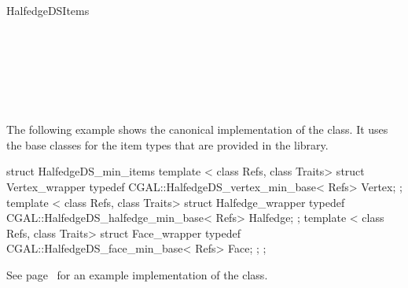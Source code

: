 \begin{ccRefConcept}{HalfedgeDSItems}
\\
\\
\\
\\
\\
\\
\\

\ccExample

The following example shows the canonical implementation of the
 class. It uses the base classes for the
item types that are provided in the library.

\begin{ccExampleCode}
struct HalfedgeDS_min_items {
    template < class Refs, class Traits>
    struct Vertex_wrapper {
        typedef CGAL::HalfedgeDS_vertex_min_base< Refs>   Vertex;
    };
    template < class Refs, class Traits>
    struct Halfedge_wrapper {
        typedef CGAL::HalfedgeDS_halfedge_min_base< Refs> Halfedge;
    };
    template < class Refs, class Traits>
    struct Face_wrapper {
        typedef CGAL::HalfedgeDS_face_min_base< Refs>     Face;
    };
};
\end{ccExampleCode}

See page~\pageref{pageHalfedgeDSitemsRef} for an example implementation 
of the  class.

\end{ccRefConcept}

\ccRefPageEnd

